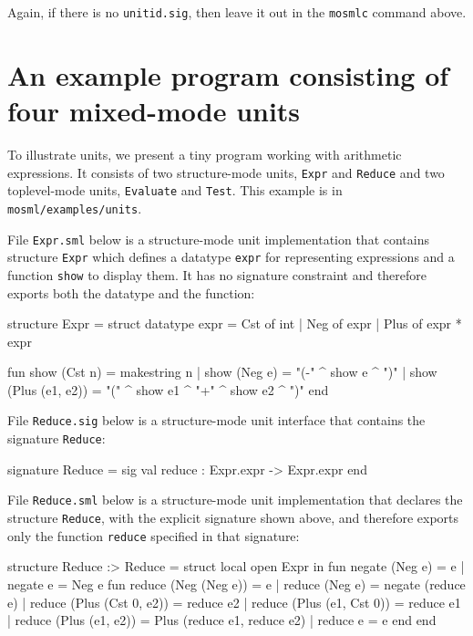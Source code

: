 \documentclass[fleqn,a4paper]{article}
\begin{document}
\noindent 
Again, if there is no \texttt{unitid.sig}, then leave it out in the
\texttt{mosmlc} command above.


\newpage
\section{An example program consisting of four mixed-mode units}
\label{sec-example-mixed-units}

To illustrate units, we present a tiny program working
with arithmetic expressions.  It consists of two structure-mode units, {\tt Expr}
and {\tt Reduce} and two toplevel-mode units, {\tt Evaluate} and {\tt Test}.  This example is in {\tt
  mosml/examples/units}.

File {\tt Expr.sml} below is a structure-mode unit implementation that
contains structure {\tt Expr} which defines a datatype {\tt expr} for
representing expressions and a function {\tt show} to display them.
It has no signature constraint and therefore exports both the datatype
and the function:

\begin{program}
structure Expr = struct
   datatype expr = Cst of int | Neg of expr | Plus of expr * expr

   fun show (Cst n)         = makestring n
     | show (Neg e)         = "(-" ^ show e ^ ")"
     | show (Plus (e1, e2)) = "(" ^ show e1 ^ "+" ^ show e2 ^ ")"
end
\end{program}

\noindent File {\tt Reduce.sig} below is a structure-mode unit interface 
that contains the signature {\tt Reduce}:

\begin{program}
signature Reduce = sig
   val reduce : Expr.expr -> Expr.expr
end
\end{program}

\noindent 
File {\tt Reduce.sml} below is a structure-mode unit implementation
that declares the structure {\tt Reduce}, with the explicit signature
shown above, and therefore exports only the function {\tt reduce}
specified in that signature:

\begin{program}
structure Reduce :> Reduce = struct 
   local open Expr
   in
       fun negate (Neg e) = e
         | negate e       = Neg e
       fun reduce (Neg (Neg e))      = e
         | reduce (Neg e)            = negate (reduce e)
         | reduce (Plus (Cst 0, e2)) = reduce e2
         | reduce (Plus (e1, Cst 0)) = reduce e1
         | reduce (Plus (e1, e2))    = Plus (reduce e1, reduce e2)
         | reduce e                  = e
   end
end
\end{program}
\end{document}
